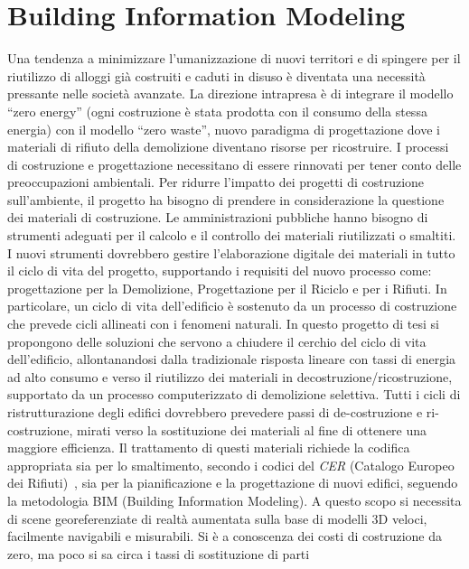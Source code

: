 \section{Building Information Modeling}
\label{sec:chapter_1_section_1}
\noindent

Una tendenza a minimizzare l'umanizzazione di nuovi territori e di spingere per il riutilizzo di alloggi
già costruiti e caduti in disuso è diventata una necessità pressante nelle società avanzate.
La direzione intrapresa è di integrare il modello ``zero energy'' (ogni costruzione è stata prodotta con il
consumo della stessa energia) con il modello ``zero waste'', nuovo paradigma di progettazione dove i materiali di
rifiuto della demolizione diventano risorse per ricostruire\cite{altamura:12}.
I processi di costruzione e progettazione necessitano di essere rinnovati per tener conto delle preoccupazioni
ambientali. Per ridurre l'impatto dei progetti di costruzione sull'ambiente, il progetto ha bisogno di prendere in
considerazione la questione dei materiali di costruzione.
Le amministrazioni pubbliche hanno bisogno di strumenti adeguati per il calcolo e il controllo dei materiali
riutilizzati o smaltiti.
I nuovi strumenti dovrebbero gestire l'elaborazione digitale dei materiali in tutto il ciclo di vita del progetto,
supportando i requisiti del nuovo processo come: progettazione per la Demolizione, Progettazione per il Riciclo e per i Rifiuti.
In particolare, un ciclo di vita dell'edificio è sostenuto da un processo di costruzione che prevede cicli allineati
con i fenomeni naturali.
In questo progetto di tesi si propongono delle  soluzioni che servono a chiudere il cerchio del ciclo di vita dell'edificio,
allontanandosi dalla tradizionale risposta lineare con tassi di energia ad alto consumo e verso il riutilizzo
dei materiali in decostruzione/ricostruzione, supportato da un processo computerizzato di demolizione selettiva.
Tutti i cicli di ristrutturazione degli edifici dovrebbero prevedere passi di de-costruzione e ri-costruzione, mirati
verso la sostituzione dei materiali al fine di ottenere una maggiore efficienza. Il trattamento di questi materiali
richiede la codifica appropriata sia per lo smaltimento, secondo i codici del \emph{CER} (Catalogo Europeo dei Rifiuti)~\cite{cer},
sia per la pianificazione e la progettazione di nuovi edifici, seguendo la metodologia BIM (Building Information Modeling).
A questo scopo si necessita di scene georeferenziate di realtà aumentata sulla base di modelli 3D veloci,
facilmente navigabili e misurabili.
Si è a conoscenza dei costi di costruzione da zero, ma poco si sa circa i tassi di sostituzione di parti
